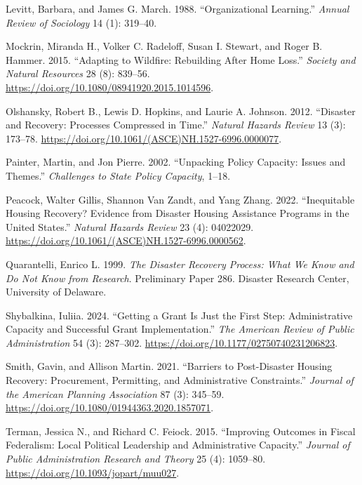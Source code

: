 \documentclass[
  12pt,
  letterpaper,
]{article}
\newlength{\cslhangindent}
\newenvironment{CSLReferences}[2] %
 {\begin{list}{}{%
  \setlength{\itemindent}{0pt}
  \setlength{\leftmargin}{0pt}
  \setlength{\parsep}{0pt}
  \ifodd #1
   \setlength{\leftmargin}{\cslhangindent}
   \setlength{\itemindent}{-1\cslhangindent}
  \fi
  \setlength{\itemsep}{#2\baselineskip}}}
 {\end{list}}
\begin{document}
\begin{CSLReferences}{1}{1}
Levitt, Barbara, and James G. March. 1988. {``Organizational
Learning.''} \emph{Annual Review of Sociology} 14 (1): 319--40.

Mockrin, Miranda H., Volker C. Radeloff, Susan I. Stewart, and Roger B.
Hammer. 2015. {``Adapting to Wildfire: Rebuilding After Home Loss.''}
\emph{Society and Natural Resources} 28 (8): 839--56.
\url{https://doi.org/10.1080/08941920.2015.1014596}.

Olshansky, Robert B., Lewis D. Hopkins, and Laurie A. Johnson. 2012.
{``Disaster and Recovery: Processes Compressed in Time.''} \emph{Natural
Hazards Review} 13 (3): 173--78.
\url{https://doi.org/10.1061/(ASCE)NH.1527-6996.0000077}.

Painter, Martin, and Jon Pierre. 2002. {``Unpacking Policy Capacity:
Issues and Themes.''} \emph{Challenges to State Policy Capacity}, 1--18.

Peacock, Walter Gillis, Shannon Van Zandt, and Yang Zhang. 2022.
{``Inequitable Housing Recovery? Evidence from Disaster Housing
Assistance Programs in the {U}nited {S}tates.''} \emph{Natural Hazards
Review} 23 (4): 04022029.
\url{https://doi.org/10.1061/(ASCE)NH.1527-6996.0000562}.

Quarantelli, Enrico L. 1999. \emph{The Disaster Recovery Process: What
We Know and Do Not Know from Research}. Preliminary Paper 286. Disaster
Research Center, University of Delaware.

Shybalkina, Iuliia. 2024. {``Getting a Grant Is Just the First Step:
Administrative Capacity and Successful Grant Implementation.''}
\emph{The American Review of Public Administration} 54 (3): 287--302.
\url{https://doi.org/10.1177/02750740231206823}.

Smith, Gavin, and Allison Martin. 2021. {``Barriers to Post-Disaster
Housing Recovery: Procurement, Permitting, and Administrative
Constraints.''} \emph{Journal of the American Planning Association} 87
(3): 345--59. \url{https://doi.org/10.1080/01944363.2020.1857071}.

Terman, Jessica N., and Richard C. Feiock. 2015. {``Improving Outcomes
in Fiscal Federalism: Local Political Leadership and Administrative
Capacity.''} \emph{Journal of Public Administration Research and Theory}
25 (4): 1059--80. \url{https://doi.org/10.1093/jopart/muu027}.


\end{CSLReferences}
\end{document}
